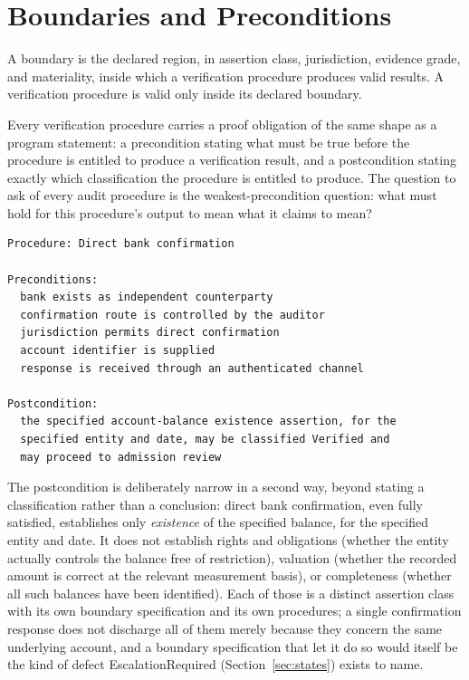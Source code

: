 \documentclass[smallcondensed,envcountsect,natbib]{svjour3}
\newcommand{\state}[1]{\textsf{#1}}
\begin{document}
\section{Boundaries and Preconditions}
\label{sec:boundaries}

\begin{definition}[Boundary]
\label{def:boundary}
A boundary is the declared region, in assertion class, jurisdiction, evidence grade, and materiality, inside which a verification procedure produces valid results. A verification procedure is valid only inside its declared boundary.
\end{definition}

Every verification procedure carries a proof obligation of the same shape as a program statement: a precondition stating what must be true before the procedure is entitled to produce a verification result, and a postcondition stating exactly which classification the procedure is entitled to produce. The question to ask of every audit procedure is the weakest-precondition question: what must hold for this procedure's output to mean what it claims to mean?

\begin{lstlisting}
Procedure: Direct bank confirmation

Preconditions:
  bank exists as independent counterparty
  confirmation route is controlled by the auditor
  jurisdiction permits direct confirmation
  account identifier is supplied
  response is received through an authenticated channel

Postcondition:
  the specified account-balance existence assertion, for the
  specified entity and date, may be classified Verified and
  may proceed to admission review
\end{lstlisting}

The postcondition is deliberately narrow in a second way, beyond stating a classification rather than a conclusion: direct bank confirmation, even fully satisfied, establishes only \emph{existence} of the specified balance, for the specified entity and date. It does not establish rights and obligations (whether the entity actually controls the balance free of restriction), valuation (whether the recorded amount is correct at the relevant measurement basis), or completeness (whether all such balances have been identified). Each of those is a distinct assertion class with its own boundary specification and its own procedures; a single confirmation response does not discharge all of them merely because they concern the same underlying account, and a boundary specification that let it do so would itself be the kind of defect \state{EscalationRequired} (Section~\ref{sec:states}) exists to name.
\end{document}
